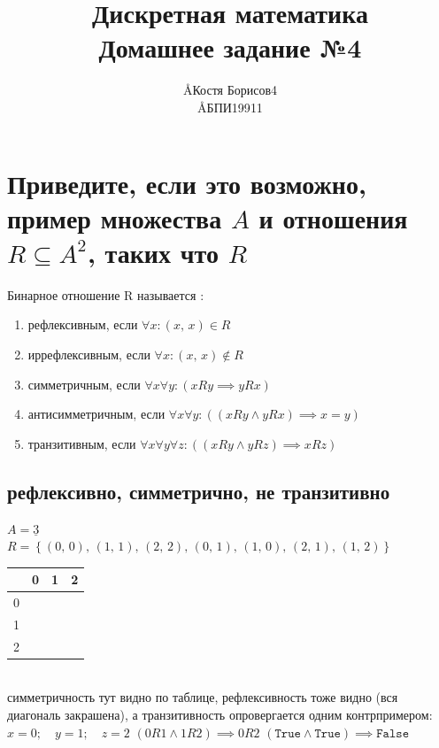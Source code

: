 \documentclass{article}
\title{Дискретная математика \\ Домашнее задание №4}
\author{\AA{Костя Борисов}{4} \\ \AA{БПИ199}{11}}
\newcommand{\ds}{\displaystyle}
\newcommand{\range}{\underline}
\newcommand{\pe}[2]{({#1},\, {#2})}
\newcommand{\p}[2]{\pe{#1}{#2},\,}
\newcommand{\K}{\cellcolor{black}}
\renewcommand{\l}{\left}
\renewcommand{\r}{\right}
\begin{document}
  \maketitle

  \section{Приведите, если это возможно, пример множества $A$ и отношения $R \subseteq A^2$, таких что $R$}
  Бинарное отношение R называется \cite{dashkov}:
  \begin{enumerate}
    \item рефлексивным, если $\forall x: (x,\, x) \in R$
    \item иррефлексивным, если $\forall x: (x,\, x) \not\in R$
    \item симметричным, если $\forall x\forall y: (xRy \implies yRx)$
    \item антисимметричным, если $\forall x\forall y: ((xRy \land yRx) \implies x=y)$
    \item транзитивным, если $\forall x\forall y\forall z: ((xRy \land yRz) \implies xRz)$
  \end{enumerate}
  \subsection{рефлексивно, симметрично, не транзитивно}
  $\ds A = \range{3}$ \\
  $\ds R = \l\{\p{0}{0} \p{1}{1} \p{2}{2} \p{0}{1} \p{1}{0} \p{2}{1} \pe{1}{2} \r\}$ \\
  \setlength\tabcolsep{4pt}
  \begin{tabular}{|c|c|c|c|}
    \hline
      & 0 & 1 & 2 \\ \hline
    0 &\K &\K &   \\ \hline
    1 &\K &\K &\K \\ \hline
    2 &   &\K &\K \\ \hline
  \end{tabular}
  \setlength\tabcolsep{6pt} \\
  симметричность тут видно по таблице, рефлексивность тоже видно (вся диагональ закрашена), а транзитивность опровергается одним контрпримером: \\
  $\ds x = 0;\quad y = 1;\quad z = 2$ \hfill
  $\ds (0R1 \land 1R2) \implies 0R2$ \hfill
  $\ds (\texttt{True} \land \texttt{True}) \implies \texttt{False}$
\end{document}
